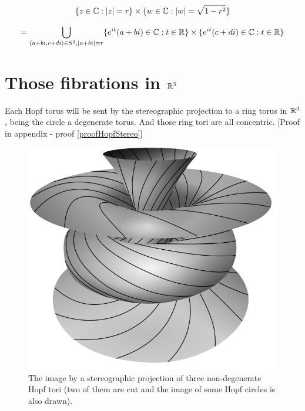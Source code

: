 \begin{equation*}
    \{ z \in \mathbb{C} : |z| = r \} \times \{ w \in \mathbb{C} : |w| = \sqrt{1-r^2} \}
\end{equation*}

\begin{equation*}
    = \bigcup\limits_{(a+bi,c+di) \in S^3, |a+bi|=r} \{ e^{it}(a+bi) \in \mathbb{C} : t \in \mathbb{R} \} \times \{ e^{it}(c+di) \in \mathbb{C}: t \in \mathbb{R} \}
\end{equation*}

\section{Those fibrations in $\mathbb{R}^3$}


Each Hopf torus will be sent by the stereographic projection to a ring torus in $\mathbb{R}^3$, being the circle a degenerate torus. And those ring tori are all concentric. [Proof in appendix - proof \ref{proofHopfStereo}]

\begin{figure}[H]
    \centering
    \includegraphics[scale=0.35]{torosHopf.png}
    \caption{The image by a stereographic projection of three non-degenerate Hopf tori (two of them are cut and the image of some Hopf circles is also drawn).}
    \label{fig:3}
\end{figure}

